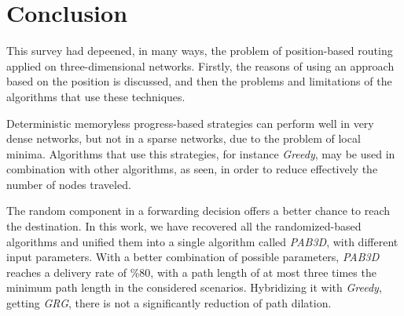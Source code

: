 \documentclass[journal,comsoc]{IEEEtran}
\begin{document}




\section{Conclusion}
This survey had depeened, in many ways, the problem of position-based routing applied on three-dimensional networks. Firstly, the reasons of using an approach based on the position is discussed, and then the problems and limitations of the algorithms that use these techniques. 
\par Deterministic memoryless progress-based strategies can perform well in very dense networks, but not in a sparse networks, due to the problem of local minima. Algorithms that use this strategies, for instance \emph{Greedy}, may be used in combination with other algorithms, as seen, in order to reduce effectively the number of nodes traveled.
\par The random component in a forwarding decision offers a better chance to reach the destination. In this work, we have recovered all the randomized-based algorithms and unified them into a single algorithm called \emph{PAB3D}, with different input parameters. With a better combination of possible parameters, \emph{PAB3D} reaches a delivery rate of \%80, with a path length of at most three times the minimum path length in the considered scenarios. Hybridizing it with \emph{Greedy}, getting \emph{GRG}, there is not a significantly reduction of path dilation.





\end{document}
